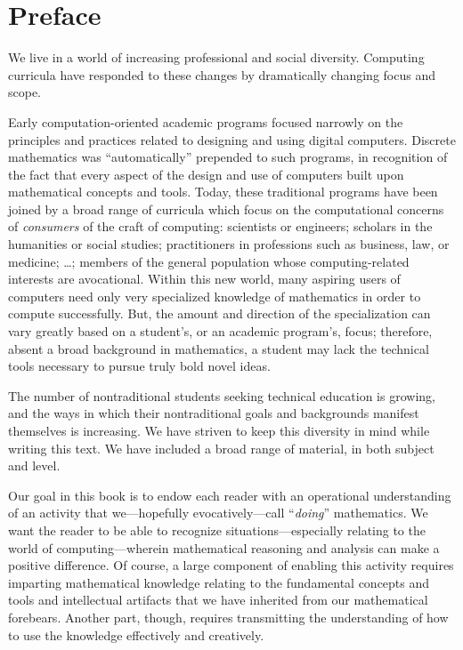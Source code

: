 
\chapter*{Preface}

We live in a world of increasing professional and social diversity.  Computing curricula have responded to these changes by dramatically changing focus and scope.

\smallskip

Early computation-oriented academic programs focused narrowly on the principles and practices related to designing and using digital computers.  Discrete mathematics was ``automatically'' prepended to such programs, in recognition of the fact that every aspect of the design and use of computers built upon mathematical concepts and tools.  Today, these traditional programs have been joined by a broad range of curricula which focus on the computational concerns of {\em
  consumers} of the craft of computing: scientists or engineers; scholars in the humanities or social studies; practitioners in professions such as business, law, or medicine; \ldots; members of the general population whose computing-related interests are avocational.  Within this new world, many aspiring users of computers need only very specialized knowledge of mathematics in order to compute successfully.  But, the amount and direction of the specialization can vary greatly
based on a student's, or an academic program's, focus; therefore, absent a broad background in mathematics, a student may lack the technical tools necessary to pursue truly bold novel ideas.

\bigskip

The number of nontraditional students seeking technical education is growing, and the ways in which their nontraditional goals and backgrounds manifest themselves is increasing.  We have striven to keep this diversity in mind while writing this text.  We have included a broad range of material, in both subject and level.

\bigskip

Our goal in this book is to endow each reader with an operational understanding of an activity that we---hopefully evocatively---call ``{\em doing}'' mathematics.  We want the reader to be able to recognize situations---especially relating to the world of computing---wherein mathematical reasoning and analysis can make a positive difference.  Of course, a large component of enabling this activity requires imparting mathematical knowledge relating to the fundamental concepts and tools and intellectual artifacts that we have inherited from our mathematical forebears.  Another part, though, requires transmitting the understanding of how to use the knowledge effectively and creatively.

